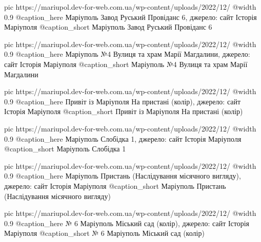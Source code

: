 	pic https://mariupol.dev-for-web.com.ua/wp-content/uploads/2022/12/%
	@width 0.9
	@caption_here Маріуполь Завод Руський Провіданс 6, джерело: сайт Історія Маріуполя
	@caption_short Маріуполь Завод Руський Провіданс 6

	pic https://mariupol.dev-for-web.com.ua/wp-content/uploads/2022/12/%
	@width 0.9
	@caption_here Маріуполь №4 Вулиця та храм Марії Магдалини, джерело: сайт Історія Маріуполя
	@caption_short Маріуполь №4 Вулиця та храм Марії Магдалини

	pic https://mariupol.dev-for-web.com.ua/wp-content/uploads/2022/12/%
	@width 0.9
	@caption_here Привіт із Маріуполя На пристані (колір), джерело: сайт Історія Маріуполя
	@caption_short Привіт із Маріуполя На пристані (колір)

	pic https://mariupol.dev-for-web.com.ua/wp-content/uploads/2022/12/%
	@width 0.9
	@caption_here Маріуполь Слобідка 1, джерело: сайт Історія Маріуполя
	@caption_short Маріуполь Слобідка 1

	pic https://mariupol.dev-for-web.com.ua/wp-content/uploads/2022/12/%
	@width 0.9
	@caption_here Маріуполь Пристань (Наслідування місячного вигляду), джерело: сайт Історія Маріуполя
	@caption_short Маріуполь Пристань (Наслідування місячного вигляду)

	pic https://mariupol.dev-for-web.com.ua/wp-content/uploads/2022/12/%
	@width 0.9
	@caption_here № 6 Маріуполь Міський сад (колір), джерело: сайт Історія Маріуполя
	@caption_short № 6 Маріуполь Міський сад (колір)

